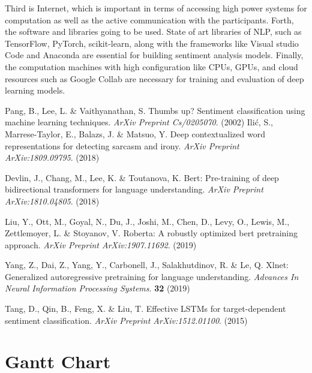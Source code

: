 \documentclass[a4paper,onecolumn,11pt]{article}
\begin{document}
    Third is Internet, which is important in terms of accessing high power systems for computation as well as the active communication with the participants. Forth, the software and libraries going to be used. State of art libraries of NLP, such as TensorFlow, PyTorch, scikit-learn, along with the frameworks like Visual studio Code and Anaconda are essential for building sentiment analysis models. Finally, the computation machines with high configuration like CPUs, GPUs, and cloud resources such as Google Collab are necessary for training and evaluation of deep learning models. 


\begin{thebibliography}{99.}

Pang, B., Lee, L. \& Vaithyanathan, S. Thumbs up? Sentiment classification using machine learning techniques. {\em ArXiv Preprint Cs/0205070}. (2002)
Ilić, S., Marrese-Taylor, E., Balazs, J. \& Matsuo, Y. Deep contextualized word representations for detecting sarcasm and irony. {\em ArXiv Preprint ArXiv:1809.09795}. (2018)

Devlin, J., Chang, M., Lee, K. \& Toutanova, K. Bert: Pre-training of deep bidirectional transformers for language understanding. {\em ArXiv Preprint ArXiv:1810.04805}. (2018)

Liu, Y., Ott, M., Goyal, N., Du, J., Joshi, M., Chen, D., Levy, O., Lewis, M., Zettlemoyer, L. \& Stoyanov, V. Roberta: A robustly optimized bert pretraining approach. {\em ArXiv Preprint ArXiv:1907.11692}. (2019)

Yang, Z., Dai, Z., Yang, Y., Carbonell, J., Salakhutdinov, R. \& Le, Q. Xlnet: Generalized autoregressive pretraining for language understanding. {\em Advances In Neural Information Processing Systems}. \textbf{32} (2019)

Tang, D., Qin, B., Feng, X. \& Liu, T. Effective LSTMs for target-dependent sentiment classification. {\em ArXiv Preprint ArXiv:1512.01100}. (2015)

\end{thebibliography}


\normalsize

\newpage
\thispagestyle{empty}
\section*{Gantt Chart}
\end{document}
